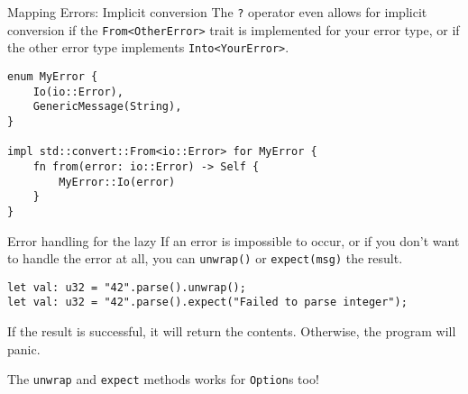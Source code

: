 
\begin{frame}[fragile]{Mapping Errors: Implicit conversion}
The \texttt{?} operator even allows for implicit conversion if the
\texttt{From<OtherError>} trait is implemented for your error type, or if the
other error type implements \texttt{Into<YourError>}.

\begin{verbatim}
enum MyError {
    Io(io::Error),
    GenericMessage(String),
}

impl std::convert::From<io::Error> for MyError {
    fn from(error: io::Error) -> Self {
        MyError::Io(error)
    }
}
\end{verbatim}
\end{frame}


\begin{frame}[fragile]{Error handling for the lazy}
If an error is impossible to occur, or if you don't want to handle the error at
all, you can \texttt{unwrap()} or \texttt{expect(msg)} the result.

\begin{verbatim}
let val: u32 = "42".parse().unwrap();
let val: u32 = "42".parse().expect("Failed to parse integer");
\end{verbatim}

If the result is successful, it will return the contents. Otherwise,
the program will panic.

The \texttt{unwrap} and \texttt{expect} methods works for \texttt{Option}s too!
\end{frame}
